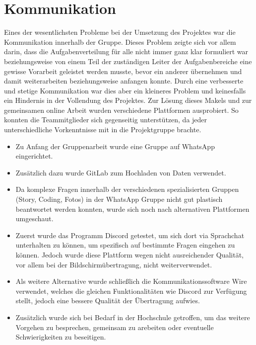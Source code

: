 \section{Kommunikation}
Eines der wesentlichsten Probleme bei der Umsetzung des Projektes war die Kommunikation innerhalb der Gruppe. Dieses Problem zeigte sich vor allem darin, dass die Aufgabenverteilung für alle nicht immer ganz klar formuliert war beziehungsweise von einem Teil der zuständigen Leiter der Aufgabenbereiche eine gewisse Vorarbeit geleistet werden musste, bevor ein anderer übernehmen und damit weiterarbeiten beziehungsweise anfangen konnte. Durch eine verbesserte und stetige Kommunikation war dies aber ein kleineres Problem und keinesfalls ein Hindernis in der Vollendung des Projektes. 
Zur Lösung dieses Makels und zur gemeinsamen online Arbeit wurden verschiedene Plattformen ausprobiert. So konnten die Teammitglieder sich gegenseitig unterstützen, da jeder unterschiedliche Vorkenntnisse mit in die Projektgruppe brachte.
\begin{itemize}
\item Zu Anfang der Gruppenarbeit wurde eine Gruppe auf WhatsApp eingerichtet.
\item Zusätzlich dazu wurde GitLab zum Hochladen von Daten verwendet.
\item Da komplexe Fragen innerhalb der verschiedenen spezialisierten Gruppen (Story, Coding, Fotos) in der WhatsApp Gruppe nicht gut plastisch beantwortet werden konnten, wurde sich noch nach alternativen Plattformen umgeschaut.
\item Zuerst wurde das Programm Discord getestet, um sich dort via Sprachchat unterhalten zu können, um spezifisch auf bestimmte Fragen eingehen zu können. Jedoch wurde diese Plattform wegen nicht ausreichender Qualität, vor allem bei der Bildschirmübertragung, nicht weiterverwendet.
\item Als weitere Alternative wurde schließlich die Kommunikationssoftware Wire verwendet, welches die gleichen Funktionalitäten wie Discord zur Verfügung stellt, jedoch eine bessere Qualität der Übertragung aufwies. 
\item Zusätzlich wurde sich bei Bedarf in der Hochschule getroffen, um das weitere Vorgehen zu besprechen, gemeinsam zu arebeiten oder eventuelle Schwierigkeiten zu beseitigen.
\end{itemize}